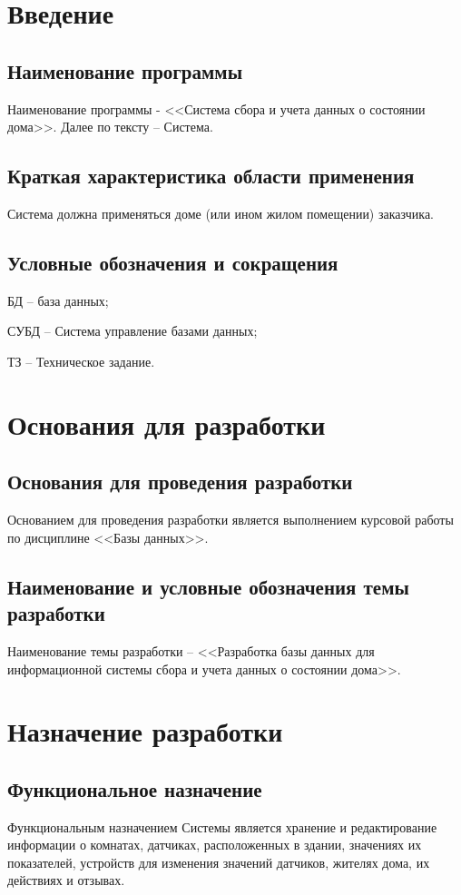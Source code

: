 \section{Введение}
  \subsection{Наименование программы}
    Наименование программы - <<Система сбора и учета данных о состоянии дома>>. Далее по тексту – Система.
  \subsection{Краткая характеристика области применения}
    Система должна применяться доме (или ином жилом помещении) заказчика.  
  \subsection{Условные обозначения и сокращения}
    БД – база данных;
    
    СУБД – Система управление базами данных;
    
    ТЗ – Техническое задание.
  \section{Основания для разработки}  
  \subsection{Основания для проведения разработки}
    Основанием для проведения разработки является выполнением курсовой работы по дисциплине <<Базы данных>>.
  \subsection{Наименование и условные обозначения темы разработки}
    Наименование темы разработки – <<Разработка базы данных для информационной системы сбора и учета данных о состоянии дома>>.
\section{Назначение разработки}
  \subsection{Функциональное назначение}
    Функциональным назначением Системы является хранение и редактирование информации о комнатах, датчиках, расположенных в здании, значениях их показателей,  устройств для изменения значений датчиков, жителях дома, их действиях и отзывах.
